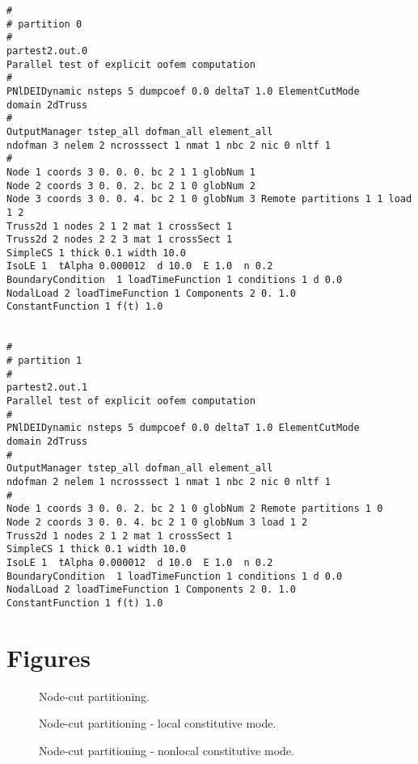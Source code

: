 \documentclass[draft]{article}
\begin{document}
\begin{verbatim}
#
# partition 0
#
partest2.out.0
Parallel test of explicit oofem computation
#
PNlDEIDynamic nsteps 5 dumpcoef 0.0 deltaT 1.0 ElementCutMode
domain 2dTruss
#
OutputManager tstep_all dofman_all element_all
ndofman 3 nelem 2 ncrosssect 1 nmat 1 nbc 2 nic 0 nltf 1
#
Node 1 coords 3 0. 0. 0. bc 2 1 1 globNum 1 
Node 2 coords 3 0. 0. 2. bc 2 1 0 globNum 2 
Node 3 coords 3 0. 0. 4. bc 2 1 0 globNum 3 Remote partitions 1 1 load 1 2
Truss2d 1 nodes 2 1 2 mat 1 crossSect 1
Truss2d 2 nodes 2 2 3 mat 1 crossSect 1
SimpleCS 1 thick 0.1 width 10.0
IsoLE 1  tAlpha 0.000012  d 10.0  E 1.0  n 0.2  
BoundaryCondition  1 loadTimeFunction 1 conditions 1 d 0.0
NodalLoad 2 loadTimeFunction 1 Components 2 0. 1.0
ConstantFunction 1 f(t) 1.0


#
# partition 1
#
partest2.out.1
Parallel test of explicit oofem computation
#
PNlDEIDynamic nsteps 5 dumpcoef 0.0 deltaT 1.0 ElementCutMode
domain 2dTruss
#
OutputManager tstep_all dofman_all element_all
ndofman 2 nelem 1 ncrosssect 1 nmat 1 nbc 2 nic 0 nltf 1
#
Node 1 coords 3 0. 0. 2. bc 2 1 0 globNum 2 Remote partitions 1 0
Node 2 coords 3 0. 0. 4. bc 2 1 0 globNum 3 load 1 2 
Truss2d 1 nodes 2 1 2 mat 1 crossSect 1
SimpleCS 1 thick 0.1 width 10.0
IsoLE 1  tAlpha 0.000012  d 10.0  E 1.0  n 0.2  
BoundaryCondition  1 loadTimeFunction 1 conditions 1 d 0.0
NodalLoad 2 loadTimeFunction 1 Components 2 0. 1.0
ConstantFunction 1 f(t) 1.0
\end{verbatim}

\section{Figures}

\begin{figure}[htb]
\centerline{}
\caption{Node-cut partitioning.}
\label{nodecut}
\end{figure}

\begin{figure}[htb]
\centerline{}
\caption{Node-cut partitioning - local constitutive mode.}
\label{nodecut-lm}
\end{figure}

\begin{figure}[htb]
\centerline{}
\caption{Node-cut partitioning - nonlocal constitutive mode.}
\label{nodecut-nlm}
\end{figure}
\end{document}
